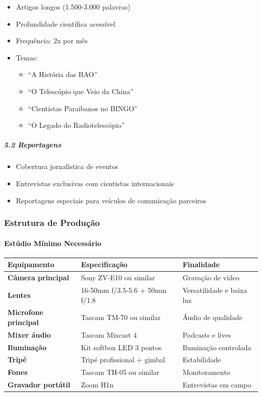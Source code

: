 \begin{itemize}
\item Artigos longos (1.500-3.000 palavras)
\item Profundidade científica acessível
\item Frequência: 2x por mês
\item Temas:

\begin{itemize}
\item ``A História das BAO''
\item ``O Telescópio que Veio da China''
\item ``Cientistas Paraibanos no BINGO''
\item ``O Legado do Radiotelescópio''
\end{itemize}
\end{itemize}

\subparagraph{5.2 Reportagens}

\begin{itemize}
\item Cobertura jornalística de eventos
\item Entrevistas exclusivas com cientistas internacionais
\item Reportagens especiais para veículos de comunicação parceiros
\end{itemize}

\subsubsection{Estrutura de Produção}

\paragraph{Estúdio Mínimo Necessário}

\bigskip\noindent
\begin{tabular}{p{}p{}p{}}
\toprule
Equipamento & Especificação & Finalidade \\
\hline
\textbf{Câmera principal} & Sony ZV-E10 ou similar & Gravação de vídeo \\
\textbf{Lentes} & 16-50mm f/3.5-5.6 + 50mm f/1.8 & Versatilidade e baixa luz \\
\textbf{Microfone principal} & Tascam TM-70 ou similar & Áudio de qualidade \\
\textbf{Mixer áudio} & Tascam Mixcast 4 & Podcasts e lives \\
\textbf{Iluminação} & Kit softbox LED 3 pontos & Iluminação controlada \\
\textbf{Tripé} & Tripé profissional + gimbal & Estabilidade \\
\textbf{Fones} & Tascam TH-05 ou similar & Monitoramento \\
\textbf{Gravador portátil} & Zoom H1n & Entrevistas em campo \\
\bottomrule
\end{tabular}


